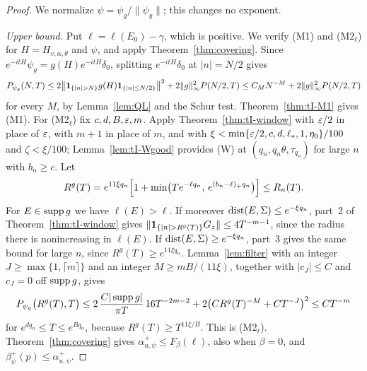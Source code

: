 \begin{proof}
We normalize $\psi=\psi_g/\|\psi_g\|$; this changes no exponent.

\emph{Upper bound.} Put $\ell=\ell(E_0)-\gamma$, which is positive. We verify (M1) and (M2$_\ell$) for $H=H_{v,\alpha,\theta}$ and $\psi$, and apply Theorem~\ref{thm:covering}. Since $e^{-itH}\psi_g=g(H)e^{-itH}\delta_0$, splitting $e^{-itH}\delta_0$ at $|n|=N/2$ gives
\[
P_{\psi_g}(N,T)\le2\bigl\|\un_{\{|n|>N\}}g(H)\un_{\{|n|\le N/2\}}\bigr\|^2+2\|g\|_\infty^2P(N/2,T)\le C_MN^{-M}+2\|g\|_\infty^2P(N/2,T)
\]
for every $M$, by Lemma~\ref{lem:QL} and the Schur test. Theorem~\ref{thm:tI-M1} gives (M1). For (M2$_\ell$) fix $c,d,B,\varepsilon,m$. Apply Theorem~\ref{thm:tI-window} with $\varepsilon/2$ in place of $\varepsilon$, with $m+1$ in place of $m$, and with $\xi<\min\{\varepsilon/2,c,d,\ell_*,1,\eta_0\}/100$ and $\zeta<\xi/100$; Lemma~\ref{lem:tI-Wgood} provides (W) at $(q_n,q_n\theta,\tau_{q_n})$ for large $n$ with $b_n\ge c$. Let
\[
R^g(T)=e^{11\xi q_n}\Bigl[1+\min\bigl(Te^{-\ell q_n},\,e^{(b_n-\ell)_+q_n}\bigr)\Bigr]\le R_n(T).
\]
For $E\in\operatorname{supp} g$ we have $\ell(E)>\ell$. If moreover $\operatorname{dist}(E,\Sigma)\le e^{-\xi q_n}$, part~2 of Theorem~\ref{thm:tI-window} gives $\|\un_{\{|n|>R^g(T)\}}G_z\|\le4T^{-m-1}$, since the radius there is nonincreasing in $\ell(E)$. If $\operatorname{dist}(E,\Sigma)\ge e^{-\xi q_n}$, part~3 gives the same bound for large $n$, since $R^g(T)\ge e^{11\xi q_n}$. Lemma~\ref{lem:filter} with an integer $J\ge\max\{1,\lceil m\rceil\}$ and an integer $M\ge mB/(11\xi)$, together with $|c_J|\le C$ and $c_J=0$ off $\operatorname{supp} g$, gives
\[
P_{\psi_g}\bigl(R^g(T),T\bigr)\le2\,\frac{C|\operatorname{supp} g|}{\pi T}\,16T^{-2m-2}+2\bigl(CR^g(T)^{-M}+CT^{-J}\bigr)^2\le CT^{-m}
\]
for $e^{dq_n}\le T\le e^{Bq_n}$, because $R^g(T)\ge T^{11\xi/B}$. This is (M2$_\ell$). Theorem~\ref{thm:covering} gives $\alpha^+_{u,\psi}\le F_\beta(\ell)$, also when $\beta=0$, and $\beta^+_\psi(p)\le\alpha^+_{u,\psi}$.


\end{proof}
